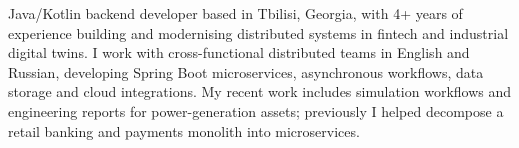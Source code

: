 \mbox{}\par
\begin{cvparagraph}
Java/Kotlin backend developer based in Tbilisi, Georgia, with 4+ years of experience building and modernising distributed systems in fintech and industrial digital twins. I work with cross-functional distributed teams in English and Russian, developing Spring Boot microservices, asynchronous workflows, data storage and cloud integrations. My recent work includes simulation workflows and engineering reports for power-generation assets; previously I helped decompose a retail banking and payments monolith into microservices.
\end{cvparagraph}
